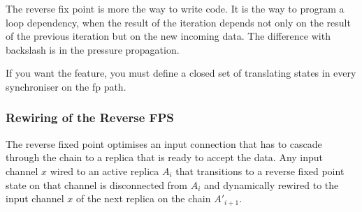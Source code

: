 %
%
%
%

The reverse fix point is more the way to write code. It is the way to program a loop dependency, when the result of the iteration depends not only on the result of the previous iteration but on the new incoming data. The difference with backslash is in the pressure propagation.

If you want the feature, you must define a closed set of translating states in every synchroniser on the fp path.


    \subsubsection{Rewiring of the Reverse FPS}
The reverse fixed point optimises an input connection that has to cascade through the chain to a replica that is ready to accept the data. Any input channel $x$ wired to an active replica $A_i$ that transitions to a reverse fixed point state on that channel is disconnected from $A_i$ and dynamically rewired to the input channel $x$ of the next replica on the chain $A'_{i+1}$.




%
%
%
%
%
%

